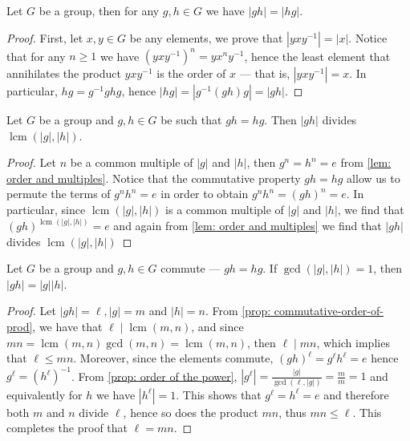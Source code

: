 \begin{proposition}\label{prop: order-prod-commutes}
Let \(G\) be a group, then for any \(g, h \in G\) we have \(|gh| = |hg|\).
\end{proposition}

\begin{proof}
First, let \(x, y \in G\) be any elements, we prove that \(|y x y^{-1}| =
|x|\). Notice that for any \(n \geq 1\) we have \((y x y^{-1})^n = y x^n
y^{-1}\), hence the least element that annihilates the product \(y x y^{-1}\)
is the order of \(x\) --- that is, \(|y x y^{-1}| = x\). In particular, \(hg =
g^{-1} gh g\), hence \(|hg| = |g^{-1} (gh) g| = |gh|\).
\end{proof}

\begin{proposition}\label{prop: commutative-order-of-prod}
Let \(G\) be a group and \(g, h \in G\) be such that \(g h = h g\). Then \(|g
h|\) divides \(\operatorname{lcm}(|g|, |h|)\).
\end{proposition}

\begin{proof}
Let \(n\) be a common multiple of \(|g|\) and \(|h|\), then \(g^n = h^n = e\)
from \cref{lem: order and multiples}. Notice that the commutative property \(g
h = h g\) allow us to permute the terms of \(g^n h^n = e\) in order to obtain
\(g^n h^n = (g h)^n = e\). In particular, since \(\operatorname{lcm}(|g|,
|h|)\) is a common multiple of \(|g|\) and \(|h|\), we find that \((g
h)^{\operatorname{lcm}(|g|, |h|)} = e\) and again from \cref{lem: order and
multiples} we find that \(|g h|\) divides \(\operatorname{lcm}(|g|, |h|)\)
\end{proof}

\begin{lemma}\label{lem: ord-prod-rel-prime}
Let \(G\) be a group and \(g, h \in G\) commute --- \(gh = hg\). If
\(\operatorname{gcd}(|g|, |h|) = 1\), then \(|gh| = |g| |h|\).
\end{lemma}

\begin{proof}
Let \(|gh| = \ell, |g| = m\) and \(|h| = n\). From \cref{prop:
commutative-order-of-prod}, we have that \(\ell \mid \operatorname{lcm}(m,
n)\), and since \(m n = \operatorname{lcm}(m, n) \operatorname{gcd}(m, n) =
\operatorname{lcm}(m, n)\), then \(\ell \mid mn\), which implies that \(\ell
\leq mn\). Moreover, since the elements commute, \((g h)^\ell = g^\ell h^\ell
= e\) hence \(g^\ell = (h^\ell)^{-1}\). From \cref{prop: order of the power},
\(|g^\ell| = \frac{|g|}{\operatorname{gcd}(\ell, |g|)} = \frac m m = 1 \) and
equivalently for \(h\) we have \(|h^\ell| = 1\). This shows that \(g^\ell =
h^\ell = e\) and therefore both \(m\) and \(n\) divide \(\ell\), hence so does
the product \(mn\), thus \(mn \leq \ell\). This completes the proof that
\(\ell = mn\).
\end{proof}

